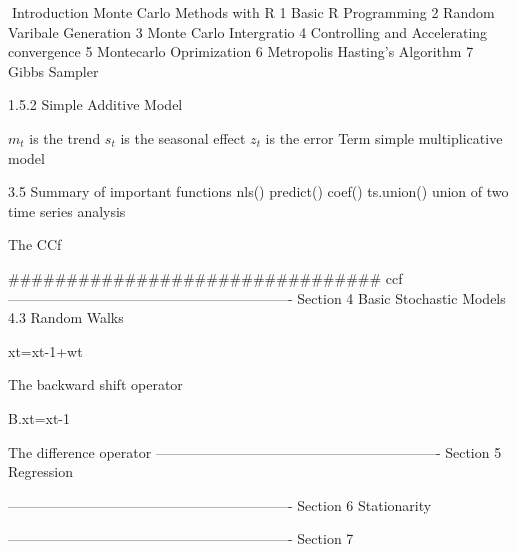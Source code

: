 
Introduction Monte Carlo Methods with R
1 Basic R Programming
2 Random Varibale Generation
3 Monte Carlo Intergratio
4 Controlling and Accelerating convergence
5 Montecarlo Oprimization
6 Metropolis Hasting's Algorithm
7 Gibbs Sampler


1.5.2 Simple Additive Model
 
            
$m_t$ is the trend
$s_t$ is the seasonal effect
$z_t$ is the error Term
simple multiplicative model
 
 
3.5 Summary of important functions
 nls()
 predict()
 coef()
 ts.union() union of two time series analysis

The CCf

################################
ccf
-------------------------------------------------------------
Section 4 Basic Stochastic Models
4.3 Random Walks


xt=xt-1+wt

The backward shift operator

B.xt=xt-1

The difference operator
-------------------------------------------------------------
Section 5 Regression

-------------------------------------------------------------
Section 6 Stationarity

-------------------------------------------------------------
Section 7

